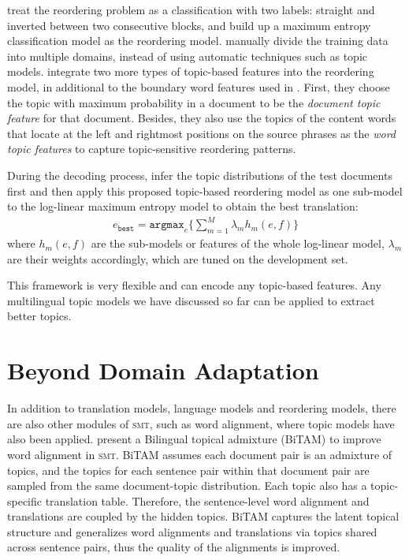 \citet{Xiong-2006} treat the
reordering problem as a classification with two labels: straight and
inverted between two consecutive blocks, and build up a maximum
entropy classification model as the reordering model.
\citet{Chen-2013} manually divide the training data into
multiple domains, instead of using automatic techniques such as topic
models.
\citet{wang-14} integrate two more types of
topic-based features into the reordering model, in additional to the
boundary word features used in \citet{Xiong-2006}. First, they choose
the topic with maximum probability in a document to be the
\textit{document topic feature} for that document. Besides, they also
use the topics of the content words that locate at the left and
rightmost positions on the source phrases as the \textit{word topic
  features} to capture topic-sensitive reordering patterns.

During the decoding process, \citet{Xiong-2006} infer the topic
distributions of the test documents first and then apply this proposed
topic-based reordering model as one sub-model to the log-linear maximum entropy model
to obtain the best translation:
\begin{align}
e_\texttt{best} = \texttt{argmax}_e \Big \{ \sum_{m=1}^M \lambda_m h_m(e,f) \Big \}
\end{align}
where $h_m(e,f)$ are the sub-models or features of the whole
log-linear model, $\lambda_m$ are their weights accordingly, which are
tuned on the development set.

This framework is very flexible and can encode any topic-based features.
Any multilingual topic models we have discussed so far can be
applied to extract better topics.

\section{Beyond Domain Adaptation}

In addition to translation models, language models and reordering models,
there are also other modules of \textsc{smt}, such as word alignment,
where topic models have also been applied. \citet{zhao-06} present a
Bilingual topical admixture (BiTAM) to improve  word
alignment in \textsc{smt}. BiTAM assumes each document pair is an
admixture of topics, and the topics for each sentence pair within that
document pair are sampled from the same document-topic
distribution. Each topic also has a topic-specific translation
table. Therefore, the sentence-level word alignment and translations
are coupled by the hidden topics.  BiTAM captures the latent
topical structure and generalizes word alignments and translations via
topics shared across sentence pairs, thus the quality of the
alignments is improved.

